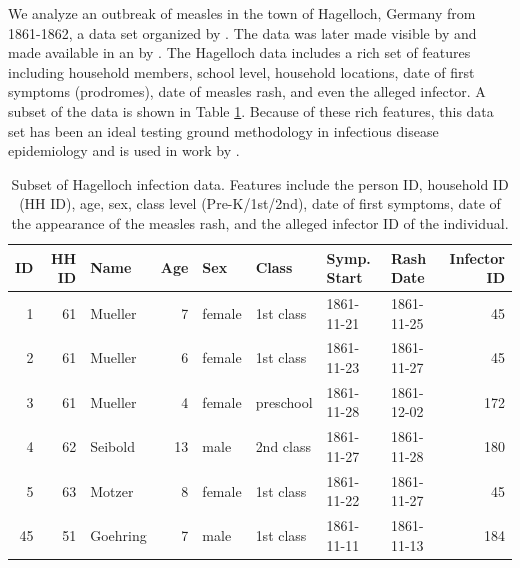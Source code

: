 \documentclass[
  shortnames]{jss}
\begin{document}
We analyze an outbreak of measles in the town of Hagelloch, Germany from
1861-1862, a data set organized by \cite{pfeilsticker1863}. The data was
later made visible by \cite{oesterle1992} and made available in an
 by \cite{surveillance2017}. The Hagelloch data includes a
rich set of features including household members, school level,
household locations, date of first symptoms (prodromes), date of measles
rash, and even the alleged infector. A subset of the data is shown in
Table \ref{tab:hags-people}. Because of these rich features, this data
set has been an ideal testing ground methodology in infectious disease
epidemiology and is used in work by
\cite{Neal2004,britton2011,groendyke2012,becker2016}.

\begin{CodeChunk}
\begin{table}[!h]

\caption{\label{tab:hags-people}Subset of Hagelloch infection data.  Features include the person ID, household ID (HH ID), age, sex, class level (Pre-K/1st/2nd), date of first symptoms, date of the appearance of the measles rash, and the alleged infector ID of the individual.}
\centering
\begin{tabular}[t]{rrlrllllr}
\toprule
ID & HH ID & Name & Age & Sex & Class & Symp. Start & Rash Date & Infector ID\\
\midrule
1 & 61 & Mueller & 7 & female & 1st class & 1861-11-21 & 1861-11-25 & 45\\
2 & 61 & Mueller & 6 & female & 1st class & 1861-11-23 & 1861-11-27 & 45\\
3 & 61 & Mueller & 4 & female & preschool & 1861-11-28 & 1861-12-02 & 172\\
4 & 62 & Seibold & 13 & male & 2nd class & 1861-11-27 & 1861-11-28 & 180\\
5 & 63 & Motzer & 8 & female & 1st class & 1861-11-22 & 1861-11-27 & 45\\
45 & 51 & Goehring & 7 & male & 1st class & 1861-11-11 & 1861-11-13 & 184\\
\bottomrule
\end{tabular}
\end{table}

\end{CodeChunk}
\end{document}
